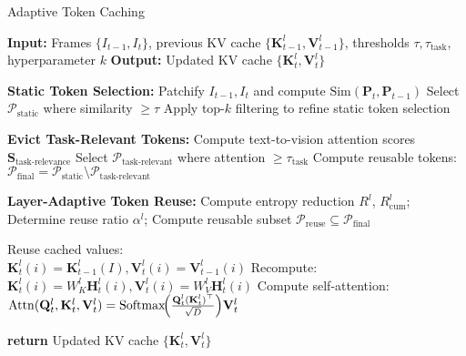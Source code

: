 \begin{algorithm}[t]
\caption{Adaptive Token Caching}
\label{alg:vla_cache}
\begin{algorithmic}[1] %
\STATE \textbf{Input:} Frames $\{I_{t-1}, I_t\}$, previous KV cache $\{\mathbf{K}_{t-1}^l, \mathbf{V}_{t-1}^l\}$, thresholds $\tau, \tau_{\text{task}}$, hyperparameter $k$
\STATE \textbf{Output:} Updated KV cache $\{\mathbf{K}_t^l, \mathbf{V}_t^l\}$

\STATE \textbf{Static Token Selection:}
\STATE Patchify $I_{t-1}, I_t$ and compute $\text{Sim}(\mathbf{P}_t, \mathbf{P}_{t-1})$
\STATE Select $\mathcal{P}_{\text{static}}$ where similarity $\geq \tau$
\STATE Apply top-$k$ filtering to refine static token selection

\STATE \textbf{Evict Task-Relevant Tokens:}
\STATE Compute text-to-vision attention scores $\mathbf{S}_{\text{task-relevance}}$
\STATE Select $\mathcal{P}_{\text{task-relevant}}$ where attention $\geq \tau_{\text{task}}$
\STATE Compute reusable tokens: $\mathcal{P}_{\mathrm{final}} = \mathcal{P}_{\text{static}} \setminus \mathcal{P}_{\text{task-relevant}}$

\STATE \textbf{Layer-Adaptive Token Reuse:}
\STATE Compute entropy reduction $R^l$, $R_{\text{cum}}^l$; Determine reuse ratio $\alpha^l$; Compute reusable subset $\mathcal{P}_{\mathrm{reuse}} \subseteq \mathcal{P}_{\mathrm{final}}$

        \STATE Reuse cached values:  \\ \quad\quad\quad $\mathbf{K}_t^l(i) = \mathbf{K}_{t-1}^l(I), 
         \mathbf{V}_t^l(i) = \mathbf{V}_{t-1}^l(i)$
    \ELSE
        \STATE Recompute: \\ \quad\quad\quad $\mathbf{K}_t^l(i) = W_K^l \mathbf{H}_t^l(i), \mathbf{V}_t^l(i) = W_V^l \mathbf{H}_t^l(i)$
    \ENDIF
    \STATE Compute self-attention: 
    \STATE $\mathrm{Attn}(\mathbf{Q}_t^l, \mathbf{K}_t^l, \mathbf{V}_t^l) = \mathrm{Softmax}\!\Bigl(\frac{\mathbf{Q}_t^l (\mathbf{K}_t^l)^\top}{\sqrt{D}}\Bigr) \mathbf{V}_t^l$
\ENDFOR

\STATE \textbf{return} Updated KV cache $\{\mathbf{K}_t^l, \mathbf{V}_t^l\}$

\end{algorithmic}
\end{algorithm}

